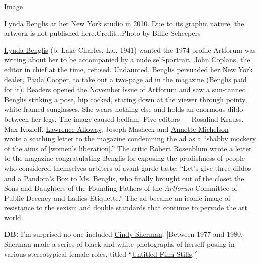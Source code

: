 Image

Lynda Benglis at her New York studio in 2010. Due to its graphic nature,
the artwork is not published here.Credit...Photo by Billie Scheepers

\href{https://www.nytimes.com/2011/02/13/arts/design/13benglis.html}{Lynda
Benglis} (b. Lake Charles, La., 1941) wanted the 1974 profile Artforum
was writing about her to be accompanied by a nude self-portrait.
\href{https://www.nytimes.com/2003/08/22/arts/john-coplans-83-an-artist-and-a-founder-of-artforum.html}{John
Coplans}, the editor in chief at the time, refused. Undaunted, Benglis
persuaded her New York dealer,
\href{https://www.nytimes.com/2016/10/11/t-magazine/art/paula-cooper-art-gallery-life-pictures.html}{Paula
Cooper}, to take out a two-page ad in the magazine (Benglis paid for
it). Readers opened the November issue of Artforum and saw a sun-tanned
Benglis striking a pose, hip cocked, staring down at the viewer through
pointy, white-framed sunglasses. She wears nothing else and holds an
enormous dildo between her legs. The image caused bedlam. Five editors
--- Rosalind Krauss, Max Kozloff,
\href{https://www.nytimes.com/1990/01/03/obituaries/lawrence-alloway-is-dead-at-63-art-historian-curator-and-critic.html}{Lawrence
Alloway}, Joseph Masheck and
\href{https://www.nytimes.com/2018/09/18/obituaries/annette-michelson-dead.html}{Annette
Michelson} --- wrote a scathing letter to the magazine condemning the ad
as a ``shabby mockery of the aims of {[}women's liberation{]}.'' The
critic
\href{https://www.nytimes.com/2006/12/09/arts/design/09rose.html}{Robert
Rosenblum} wrote a letter to the magazine congratulating Benglis for
exposing the prudishness of people who considered themselves arbiters of
avant-garde taste: ``Let's give three dildos and a Pandora's Box to Ms.
Benglis, who finally brought out of the closet the Sons and Daughters of
the Founding Fathers of the \emph{Artforum} Committee of Public Decency
and Ladies Etiquette.'' The ad became an iconic image of resistance to
the sexism and double standards that continue to pervade the art world.

\textbf{DB:} I'm surprised no one included
\href{https://www.nytimes.com/topic/person/cindy-sherman}{Cindy
Sherman}. {[}Between 1977 and 1980, Sherman made a series of
black-and-white photographs of herself posing in various stereotypical
female roles, titled
``\href{https://www.nytimes.com/2014/10/17/arts/design/cindy-shermans-untitled-film-stills-go-to-auction-.html}{Untitled
Film Stills}.''{]}

